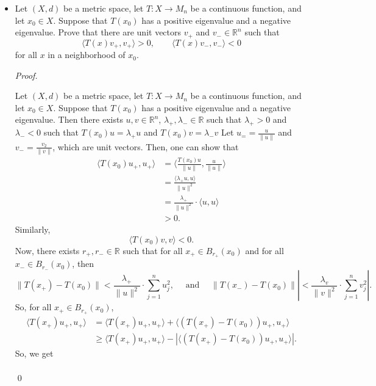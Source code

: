 \documentclass[12pt]{article}
\newenvironment{problem}[2][Problem]{\begin{trivlist}
\item[\hskip \labelsep {\bfseries #1}\hskip \labelsep {\bfseries #2.}]}{\end{trivlist}}
\newenvironment{sol}
    {\emph{Proof.}
    }
    {
    \qed
    }
\begin{document}
\begin{problem}{18} \text{ } \begin{itemize}
    \item[(a)] Let $(X,d)$ be a metric space, let $T : X \to M_n$ be a continuous function, and let $x_0 \in X$. Suppose that $T(x_0)$ has a positive eigenvalue and a negative eigenvalue. Prove that there are unit vectors $v_+$ and $v_- \in \mathbb{R}^n$ such that $$\langle T(x)v_+,v_+ \rangle > 0, \hspace{2em} \langle T(x)v_-,v_- \rangle < 0$$ for all $x$ in a neighborhood of $x_0$.
    
    \begin{sol}
    Let $(X,d)$ be a metric space, let $T : X \to M_n$ be a continuous function, and let $x_0 \in X$. Suppose that $T(x_0)$ has a positive eigenvalue and a negative eigenvalue. Then there exists $u,v \in \mathbb{R}^n$, $\lambda_+,\lambda_- \in \mathbb{R}$ such that $\lambda_+ > 0$ and $\lambda_- < 0$ such that $T(x_0)u = \lambda_+u$ and $T(x_0)v = \lambda_-v$ Let $u_= = \frac{u}{\lVert u \rVert}$ and $v_- = \frac{v_2}{\lVert v \rVert}$, which are unit vectors. Then, one can show that \begin{align*}
        \langle T(x_0)u_+,u_+\rangle &= \langle \frac{T(x_0)u}{\lVert u \rVert}, \frac{u}{\lVert u \rVert}\rangle \\ &= \frac{\langle \lambda_+u,u\rangle}{\lVert u \rVert^2} \\ &= \frac{\lambda_+}{\lVert u \rVert^2} \cdot \langle u, u \rangle \\ &> 0.
    \end{align*}
    Similarly, $$\langle T(x_0)v,v\rangle < 0.$$ Now, there exists $r_+,r_- \in \mathbb{R}$ such that for all $x_+ \in B_{r_+}(x_0)$ and for all $x_- \in B_{r_-}(x_0)$, then $$\lVert T(x_+) - T(x_0) \rVert < \frac{\lambda_+}{\lVert u \rVert^2} \cdot \sum_{j = 1}^nu_j^2, \hspace{1em} \text{ and } \hspace{1em} \lVert T(x_-) - T(x_0) \rVert \left| < \frac{\lambda_v}{\lVert v \rVert^2} \cdot \sum_{j = 1}^nv_j^2 \right|.$$ So, for all $x_+ \in B_{r_+}(x_0)$, \begin{align*}
        \langle T(x_+)u_+, u_+ \rangle &= \langle T(x_+)u_+, u_+ \rangle + \langle (T(x_+) - T(x_0))u_+, u_+ \rangle \\ &\geq \langle T(x_+)u_+, u_+ \rangle - \left| \langle (T(x_+) - T(x_0))u_+, u_+ \rangle \right|.
    \end{align*}
    So, we get \begin{align*}

\end{align*}
\end{sol}
\end{itemize}
\end{problem}
\end{document}
